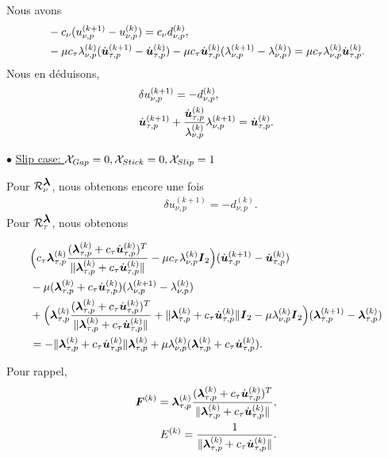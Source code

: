 \noindent Nous avons
\begin{align}
&-c_{\nu}(u_{\nu, p}^{(k+1)}-u_{\nu, p}^{(k)})=c_{\nu}d_{\nu, p}^{(k)}, \\
& -\mu c_\tau \lambda_{\nu, p}^{(k)}(\dot{\mbox{\boldmath{$u$}}}_{\tau, p}^{(k+1)}-\dot{\mbox{\boldmath{$u$}}}_{\tau, p}^{(k)})-\mu c_\tau \dot{\mbox{\boldmath{$u$}}}_{\tau, p}^{(k)}(\lambda_{\nu, p}^{(k+1)}-\lambda_{\nu, p}^{(k)}) = \mu c_\tau \lambda_{\nu, p}^{(k)}\dot{\mbox{\boldmath{$u$}}}_{\tau, p}^{(k)}.
\end{align}
Nous en déduisons,
\begin{align}
&\delta u^{(k+1)}_{\nu,p} = -d^{(k)}_{\nu,p}, \\
& \dot{\mbox{\boldmath{$u$}}}_{\tau, p}^{(k+1)}+\frac{\dot{\mbox{\boldmath{$u$}}}_{\tau, p}^{(k)}}{\lambda_{\nu, p}^{(k)}}\lambda_{\nu, p}^{(k+1)} =\dot{\mbox{\boldmath{$u$}}}_{\tau, p}^{(k)}.
\end{align}

$\bullet$ \underline{Slip case: ${\cal X}_{Gap} =0, {\cal X}_{Stick} = 0, {\cal X}_{Slip} = 1$}

\noindent Pour ${\cal R}_{\nu}^{\mbox{\boldmath{$\lambda$}}}$, nous obtenons encore une fois 
\begin{align}
&\delta u^{(k+1)}_{\nu,p} = -d^{(k)}_{\nu,p}.
\end{align}
Pour ${\cal R}_{\tau}^{\mbox{\boldmath{$\lambda$}}}$, nous obtenons

\begin{align}
&\Big(c_\tau \mbox{\boldmath{$\lambda$}}_{\tau, p}^{(k)}\frac{(\mbox{\boldmath{$\lambda$}}_{\tau, p}^{(k)}+c_\tau \dot{\mbox{\boldmath{$u$}}}_{\tau, p}^{(k)})^T}{\|\mbox{\boldmath{$\lambda$}}_{\tau, p}^{(k)}+c_\tau \dot{\mbox{\boldmath{$u$}}}_{\tau, p}^{(k)}\|}-\mu c_\tau \lambda_{\nu, p}^{(k)}\mbox{\boldmath{$I$}}_2\Big)(\dot{\mbox{\boldmath{$u$}}}_{\tau, p}^{(k+1)}-\dot{\mbox{\boldmath{$u$}}}_{\tau, p}^{(k)}) \label{phi2c}\\
&  - \mu (\mbox{\boldmath{$\lambda$}}_{\tau, p}^{(k)}+c_\tau \dot{\mbox{\boldmath{$u$}}}_{\tau, p}^{(k)})(\lambda_{\nu, p}^{(k+1)}-\lambda_{\nu, p}^{(k)})\nonumber\\
& +\Big( \mbox{\boldmath{$\lambda$}}_{\tau, p}^{(k)}\frac{(\mbox{\boldmath{$\lambda$}}_{\tau, p}^{(k)}+c_\tau \dot{\mbox{\boldmath{$u$}}}_{\tau, p}^{(k)})^T}{\|\mbox{\boldmath{$\lambda$}}_{\tau, p}^{(k)}+c_\tau \dot{\mbox{\boldmath{$u$}}}_{\tau, p}^{(k)}\|} +\|\mbox{\boldmath{$\lambda$}}_{\tau, p}^{(k)}+c_\tau \dot{\mbox{\boldmath{$u$}}}_{\tau, p}^{(k)}\|\mbox{\boldmath{$I$}}_2 - \mu\lambda_{\nu, p}^{(k)}\mbox{\boldmath{$I$}}_2  \Big)(\mbox{\boldmath{$\lambda$}}_{\tau, p}^{(k+1)}-\mbox{\boldmath{$\lambda$}}_{\tau, p}^{(k)})\nonumber\\
&= -\|\mbox{\boldmath{$\lambda$}}_{\tau, p}^{(k)}+c_\tau \dot{\mbox{\boldmath{$u$}}}_{\tau, p}^{(k)}\|\mbox{\boldmath{$\lambda$}}_{\tau, p}^{(k)}+ \mu\lambda_{\nu, p}^{(k)} (\mbox{\boldmath{$\lambda$}}_{\tau, p}^{(k)}+c_\tau \dot{\mbox{\boldmath{$u$}}}_{\tau, p}^{(k)})\nonumber.
\end{align}

\noindent Pour rappel,
\begin{align*}
\mbox{\boldmath{$F$}}^{(k)}=\mbox{\boldmath{$\lambda$}}_{\tau, p}^{(k)}\frac{(\mbox{\boldmath{$\lambda$}}_{\tau, p}^{(k)}+c_\tau \dot{\mbox{\boldmath{$u$}}}_{\tau, p}^{(k)})^T}{\|\mbox{\boldmath{$\lambda$}}_{\tau, p}^{(k)}+c_\tau \dot{\mbox{\boldmath{$u$}}}_{\tau, p}^{(k)}\|},\\
E^{(k)}=\frac{1}{\|\mbox{\boldmath{$\lambda$}}_{\tau, p}^{(k)}+c_\tau \dot{\mbox{\boldmath{$u$}}}_{\tau, p}^{(k)}\|}.
\end{align*}


